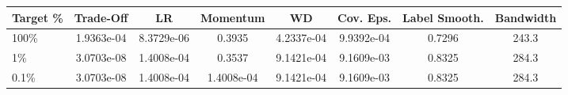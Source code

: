 \begin{tabular}{l | c c c c c c c}
\toprule
Target \% & Trade-Off & LR & Momentum & WD & Cov. Eps. & Label Smooth. & Bandwidth \\
\midrule
100\% & 1.9363e-04 & 8.3729e-06 & 0.3935 & 4.2337e-04 & 9.9392e-04 & 0.7296 & 243.3 \\
1\% & 3.0703e-08 & 1.4008e-04 & 0.3537 & 9.1421e-04 & 9.1609e-03 & 0.8325 & 284.3 \\
0.1\% & 3.0703e-08 & 1.4008e-04 & 1.4008e-04 & 9.1421e-04 & 9.1609e-03 & 0.8325 & 284.3 \\
\bottomrule
\end{tabular}
